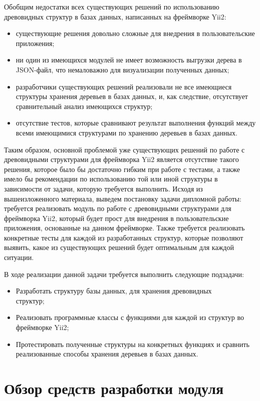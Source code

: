 \documentclass[a4paper,14pt]{extreport}
\theoremstyle{definition}
\begin{document}
Обобщим недостатки всех существующих решений по использованию древовидных структур в базах данных, написанных на фреймворке Yii2:
\begin{itemize}
\item существующие решения довольно сложные для внедрения в пользовательские приложения;
\item ни один из имеющихся модулей не имеет возможность выгрузки дерева в JSON-файл, что немаловажно для визуализации полученных данных;
\item разработчики существующих решений реализовали не все имеющиеся структуры хранения деревьев в базах данных, и, как следствие, отсутствует сравнительный анализ имеющихся структур;
\item отсутствие тестов, которые сравнивают результат выполнения функций между всеми имеющимися структурами по хранению деревьев в базах данных.
\end{itemize}

Таким образом, основной проблемой уже существующих решений по работе с древовидными структурами для фреймворка Yii2 является отсутствие такого решения, которое было бы достаточно гибким при работе с тестами, а также имело бы рекомендации по использованию той или иной структуры в зависимости от задачи, которую требуется выполнить.
Исходя из вышеизложенного материала, выведем постановку задачи дипломной работы: требуется реализовать модуль по работе с древовидными структурами для фреймворка Yii2, который будет прост для внедрения в пользовательские приложения, основанные на данном фреймворке. Также требуется реализовать конкретные тесты для каждой из разработанных структур, которые позволяют выявить, какое из существующих решений будет оптимальным для каждой ситуации.

В ходе реализации данной задачи требуется выполнить следующие подзадачи:
\begin{itemize}
\item Разработать структуру базы данных, для хранения древовидных \\ структур;
\item Реализовать программные классы с функциями для каждой из структур во фреймворке Yii2;
\item Протестировать полученные структуры на конкретных функциях и сравнить реализованные способы хранения деревьев в базах данных.
\end{itemize}
\chapter{Обзор средств разработки модуля}
\end{document}
